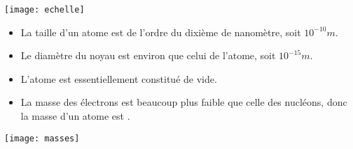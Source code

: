 \begin{mybilan}
	
	\begin{center}
		\texttt{[image: echelle]}
	\end{center}

	\begin{itemize}
		\item La taille d'un atome est de l'ordre du dixième de nanomètre, soit $10^{-10} m$.
		\item Le diamètre du noyau est environ  que celui de l'atome, soit $10^{-15} m$.
		\item L'atome est essentiellement constitué de vide.
		\item La masse des électrons est beaucoup plus faible que celle des nucléons, donc la masse d'un atome est .
	\end{itemize}

	
		
		\begin{center}
			\texttt{[image: masses]}
		\end{center}
	
\end{mybilan}
